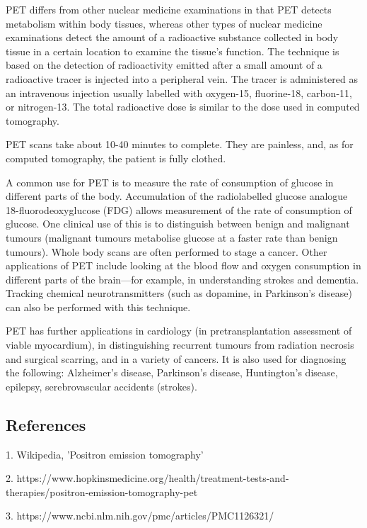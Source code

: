 \documentclass[11pt]{article}
\begin{document}
PET differs from other nuclear medicine examinations in that PET detects metabolism within body tissues, whereas other types of nuclear medicine examinations detect the amount of a radioactive substance collected in body tissue in a certain location to examine the tissue's function. The technique is based on the detection of radioactivity emitted after a small amount of a radioactive tracer is injected into a peripheral vein. The tracer is administered as an intravenous injection usually labelled with oxygen-15, fluorine-18, carbon-11, or nitrogen-13. The total radioactive dose is similar to the dose used in computed tomography. 

PET scans take about 10-40 minutes to complete. They are painless, and, as for computed tomography, the patient is fully clothed. 

A common use for PET is to measure the rate of consumption of glucose in different parts of the body. Accumulation of the radiolabelled glucose analogue 18-fluorodeoxyglucose (FDG) allows measurement of the rate of consumption of glucose. One clinical use of this is to distinguish between benign and malignant tumours (malignant tumours metabolise glucose at a faster rate than benign tumours). Whole body scans are often performed to stage a cancer. Other applications of PET include looking at the blood flow and oxygen consumption in different parts of the brain—for example, in understanding strokes and dementia. Tracking chemical neurotransmitters (such as dopamine, in Parkinson's disease) can also be performed with this technique.

PET has further applications in cardiology (in pretransplantation assessment of viable myocardium), in distinguishing recurrent tumours from radiation necrosis and surgical scarring, and in a variety of cancers. It is also used for diagnosing the following: Alzheimer's disease, Parkinson's disease, Huntington's disease, epilepsy, serebrovascular accidents (strokes).  





\subsection*{\centering References}


1. Wikipedia, 'Positron emission tomography'

2. https://www.hopkinsmedicine.org/health/treatment-tests-and-therapies/positron-emission-tomography-pet

3. https://www.ncbi.nlm.nih.gov/pmc/articles/PMC1126321/
\end{document}
